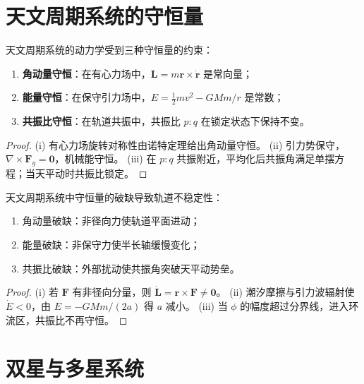 \section{天文周期系统的守恒量}

\begin{theorem}[天文系统的三种守恒量]\label{thm:astronomical_conservation_laws}
天文周期系统的动力学受到三种守恒量的约束：
\begin{enumerate}[label=(\roman*)]
    \item \textbf{角动量守恒}：在有心力场中，\(\mathbf L=m\mathbf r\times\dot{\mathbf r}\) 是常向量；
    \item \textbf{能量守恒}：在保守引力场中，\(E=\frac12mv^2-GMm/r\) 是常数；
    \item \textbf{共振比守恒}：在轨道共振中，共振比 \(p:q\) 在锁定状态下保持不变。
\end{enumerate}
\end{theorem}

\begin{proof}
(i) 有心力场旋转对称性由诺特定理给出角动量守恒。
(ii) 引力势保守，\(\nabla\times\mathbf F_g=\mathbf 0\)，机械能守恒。
(iii) 在 \(p:q\) 共振附近，平均化后共振角满足单摆方程；当天平动时共振比锁定。
\end{proof}

\begin{proposition}[守恒量破缺与轨道不稳定性]\label{prop:astronomical_conservation_breaking}
天文周期系统中守恒量的破缺导致轨道不稳定性：
\begin{enumerate}[label=(\roman*)]
    \item 角动量破缺：非径向力使轨道平面进动；
    \item 能量破缺：非保守力使半长轴缓慢变化；
    \item 共振比破缺：外部扰动使共振角突破天平动势垒。
\end{enumerate}
\end{proposition}

\begin{proof}
(i) 若 \(\mathbf F\) 有非径向分量，则 \(\dot{\mathbf L}=\mathbf r\times\mathbf F\neq\mathbf 0\)。
(ii) 潮汐摩擦与引力波辐射使 \(\dot E<0\)，由 \(E=-GMm/(2a)\) 得 \(a\) 减小。
(iii) 当 \(\phi\) 的幅度超过分界线，进入环流区，共振比不再守恒。
\end{proof}

\section{双星与多星系统}

